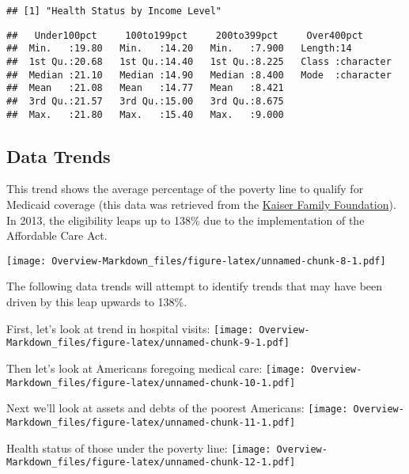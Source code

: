 \documentclass[
]{article}
\begin{document}
\begin{verbatim}
## [1] "Health Status by Income Level"
\end{verbatim}

\begin{verbatim}
##   Under100pct     100to199pct     200to399pct     Over400pct       
##  Min.   :19.80   Min.   :14.20   Min.   :7.900   Length:14         
##  1st Qu.:20.68   1st Qu.:14.40   1st Qu.:8.225   Class :character  
##  Median :21.10   Median :14.90   Median :8.400   Mode  :character  
##  Mean   :21.08   Mean   :14.77   Mean   :8.421                     
##  3rd Qu.:21.57   3rd Qu.:15.00   3rd Qu.:8.675                     
##  Max.   :21.80   Max.   :15.40   Max.   :9.000
\end{verbatim}

\hypertarget{data-trends}{%
\subsection{Data Trends}\label{data-trends}}

This trend shows the average percentage of the poverty line to qualify
for Medicaid coverage (this data was retrieved from the
\href{https://www.kff.org/medicaid/state-indicator/medicaid-income-eligibility-limits-for-parents/?currentTimeframe=0\&selectedDistributions=january-2002--april-2003--july-2004--july-2005--july-2006--january-2008--january-2009--december-2009--january-2011--january-2012--january-2013--january-2014--january-2015--january-2016--january-2017--january-2018--january-2019--january-2020--january-2021--january-2022\&selectedRows=\%7B\%22wrapups\%22:\%7B\%22united-states\%22:\%7B\%7D\%7D\%7D\&sortModel=\%7B\%22colId\%22:\%22Location\%22,\%22sort\%22:\%22asc\%22\%7D}{Kaiser
Family Foundation}). In 2013, the eligibility leaps up to 138\% due to
the implementation of the Affordable Care Act.

\texttt{[image: Overview-Markdown\_files/figure-latex/unnamed-chunk-8-1.pdf]}

The following data trends will attempt to identify trends that may have
been driven by this leap upwards to 138\%.

First, let's look at trend in hospital visits:
\texttt{[image: Overview-Markdown\_files/figure-latex/unnamed-chunk-9-1.pdf]}

Then let's look at Americans foregoing medical care:
\texttt{[image: Overview-Markdown\_files/figure-latex/unnamed-chunk-10-1.pdf]}

Next we'll look at assets and debts of the poorest Americans:
\texttt{[image: Overview-Markdown\_files/figure-latex/unnamed-chunk-11-1.pdf]}

Health status of those under the poverty line:
\texttt{[image: Overview-Markdown\_files/figure-latex/unnamed-chunk-12-1.pdf]}
\end{document}
